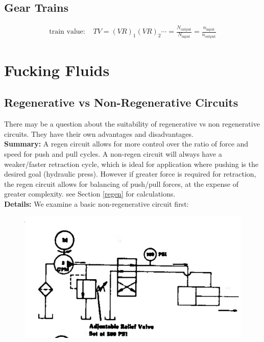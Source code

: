 \documentclass[11pt, fleqn]{article}
\begin{document}
\subsection{Gear Trains}
\begin{align*}
    \text{train value: }&TV=(VR)_1(VR)_2\cdots=\frac{N_\text{output}}{N_\text{input}}=\frac{n_\text{input}}{n_\text{output}}
\end{align*}

\section{Fucking Fluids}
\subsection{Regenerative vs Non-Regenerative Circuits}
There may be a question about the suitability of regenerative vs non regenerative circuits.  They have their own advantages and disadvantages.\\


\textbf{Summary:} A regen circuit allows for more control over the ratio of force and speed for push and pull cycles.  A non-regen circuit will always have a weaker/faster retraction cycle, which is ideal for application where pushing is the desired goal (hydraulic press).  However if greater force is required for retraction, the regen circuit allows for balancing of push/pull forces, at the expense of greater complexity.  see Section \ref{regen} for calculations. \\   

\textbf{Details:}
We examine a basic non-regenerative circuit first:

    \begin{figure}[!h]
    \centering
            \includegraphics[scale=.5]{Fluids/basicCircuit.png}
    \end{figure}
\end{document}
